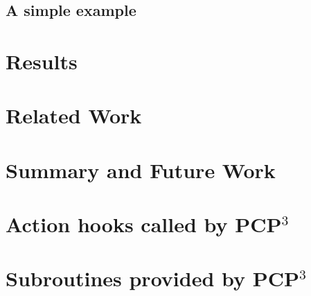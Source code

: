 \documentclass{article}
\newcommand{\pcp}{\mbox{\textsf{PCP}$^3$}}
\begin{document}
\subsection{A simple example}



\section{Results}
\label{sec:results}

\section{Related Work}
\label{sec:related}

\section{Summary and Future Work}
\label{sec:summary}

\appendix
\newpage
\section{Action hooks called by \pcp}
\begin{footnotesize}
\label{sec:hooks}
\begin{itemize}
\sloppy

\fussy
\end{itemize}
\end{footnotesize}

\newpage
\section{Subroutines provided by \pcp}
\label{sec:backcalls}
\begin{footnotesize}
\begin{itemize}
\sloppy

\fussy
\end{itemize}
\end{footnotesize}

\newpage

\nocite{ARM}
\nocite{Dragon}
\nocite{Glickstein97} %
\nocite{Camel}        %
\nocite{Levine92}     %
\nocite{Harbison91}   %
\nocite{Stroustrup97} %
\nocite{Stroustrup94} %
\nocite{Kernighan88}  %
\nocite{Flanagan96}   %
\nocite{BtYACC}
\nocite{EmpCpp-TR}
\nocite{GCC}
\nocite{CTree}
\nocite{TXL}
\nocite{Cordy92}
\nocite{BtYACC}
\nocite{Bison}
\nocite{Flex}
\nocite{Krone94}
\nocite{Griswold96}
\nocite{Atkinson96}
\nocite{CD2DraftStandard}



\end{document}
